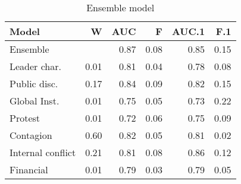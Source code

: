 \begin{table}[ht]
\centering
\begin{tabular}{lrrrrr}
  \hline
Model & W & AUC & F & AUC.1 & F.1 \\ 
  \hline
Ensemble &  & 0.87 & 0.08 & 0.85 & 0.15 \\ 
  Leader char. & 0.01 & 0.81 & 0.04 & 0.78 & 0.08 \\ 
  Public disc. & 0.17 & 0.84 & 0.09 & 0.82 & 0.15 \\ 
  Global Inst. & 0.01 & 0.75 & 0.05 & 0.73 & 0.22 \\ 
  Protest & 0.01 & 0.72 & 0.06 & 0.75 & 0.09 \\ 
  Contagion & 0.60 & 0.82 & 0.05 & 0.81 & 0.02 \\ 
  Internal conflict & 0.21 & 0.81 & 0.08 & 0.86 & 0.12 \\ 
  Financial & 0.01 & 0.79 & 0.03 & 0.79 & 0.05 \\ 
   \hline
\end{tabular}
\caption{Ensemble model} 
\label{tab:ensemble}
\end{table}


